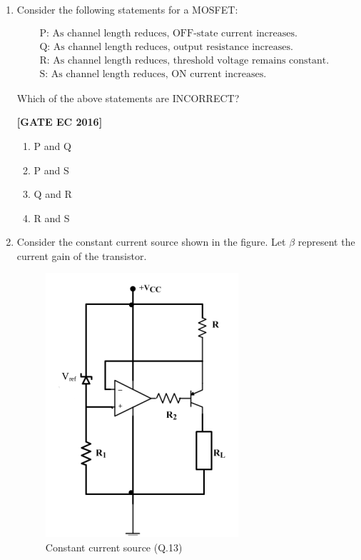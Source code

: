 \documentclass[12pt]{article}
\begin{document}
\begin{enumerate}[label=\textbf{Q.\arabic*.}, start=6, itemsep=2em]
\begin{enumerate}[label=\textbf{Q.\arabic*.}]
\item Consider the following statements for a MOSFET:

\[
\begin{array}{ll}
\text{P: As channel length reduces, OFF-state current increases.} & \\
\text{Q: As channel length reduces, output resistance increases.} & \\
\text{R: As channel length reduces, threshold voltage remains constant.} & \\
\text{S: As channel length reduces, ON current increases.} &
\end{array}
\]

Which of the above statements are INCORRECT?

\noindent \textbf{[GATE EC 2016]}

\begin{multicols}{2}
\begin{enumerate}[label=\alph*.]
    \item P and Q
    \item P and S
    \item Q and R
    \item R and S
\end{enumerate}
\end{multicols}

\item Consider the constant current source shown in the figure. Let $\beta$ represent the current gain of the transistor.

\begin{figure}[H]\centering
    \includegraphics[width=0.55\columnwidth]{figs/q13.png}
    \caption{Constant current source (Q.13)}
    \label{fig:q13}
\end{figure}


\end{enumerate}
\end{enumerate}
\end{document}
